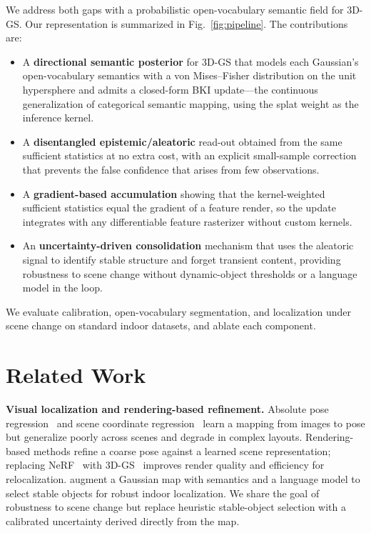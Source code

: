 \documentclass[journal]{IEEEtran}
\begin{document}
We address both gaps with a probabilistic open-vocabulary semantic field for
3D-GS. Our representation is summarized in Fig.~\ref{fig:pipeline}. The
contributions are:

\begin{itemize}
\item A \textbf{directional semantic posterior} for 3D-GS that models each
Gaussian's open-vocabulary semantics with a von Mises--Fisher distribution on
the unit hypersphere and admits a closed-form BKI update---the continuous
generalization of categorical semantic mapping, using the splat weight as the
inference kernel.
\item A \textbf{disentangled epistemic/aleatoric} read-out obtained from the same
sufficient statistics at no extra cost, with an explicit small-sample correction
that prevents the false confidence that arises from few observations.
\item A \textbf{gradient-based accumulation} showing that the kernel-weighted
sufficient statistics equal the gradient of a feature render, so the update
integrates with any differentiable feature rasterizer without custom kernels.
\item An \textbf{uncertainty-driven consolidation} mechanism that uses the
aleatoric signal to identify stable structure and forget transient content,
providing robustness to scene change without dynamic-object thresholds or a
language model in the loop.
\end{itemize}

We evaluate calibration, open-vocabulary segmentation, and localization under
scene change on standard indoor datasets, and ablate each component.

\section{Related Work}
\textbf{Visual localization and rendering-based refinement.} Absolute pose
regression~\cite{chen2024marepo} and scene coordinate
regression~\cite{brachmann2023ace} learn a mapping from images to pose but
generalize poorly across scenes and degrade in complex layouts. Rendering-based
methods refine a coarse pose against a learned scene representation; replacing
NeRF~\cite{mildenhall2020nerf} with 3D-GS~\cite{kerbl2023} improves render
quality and efficiency for relocalization. \cite{chu2026semantic} augment a
Gaussian map with semantics and a language model to select stable objects for
robust indoor localization. We share the goal of robustness to scene change but
replace heuristic stable-object selection with a calibrated uncertainty derived
directly from the map.
\end{document}
